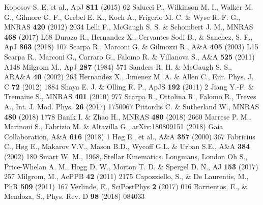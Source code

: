 \documentclass{ws-ijmpd}
\begin{document}
\begin{thebibliography}{0}    %

 Koposov S. E. et al., ApJ {\bf 811} (2015) 62
 Salucci P., Wilkinson M. I., Walker M. G., Gilmore G. F., Grebel E. K.,
  Koch A., Frigerio M. C. \& Wyse R. F. G., MNRAS {\bf 420} (2012) 2034
 Lelli F., McGaugh S. S. \& Schombert J. M., MNRAS {\bf 468} (2017) L68
 Durazo R., Hernandez X., Cervantes Sodi B., \& Sanchez, S. F., ApJ {\bf 863} (2018) 107
 Scarpa R., Marconi G. \& Gilmozzi R., A\&A {\bf 405} (2003) L15
 Scarpa R., Marconi G., Carraro G., Falomo R. \& Villanova S., A\&A {\bf 525}  (2011) A148
 Milgrom M., ApJ {\bf 287} (1984) 571
 Sanders R. H. \& McGaugh S. S., ARA\&A {\bf 40} (2002) 263
 Hernandez X., Jimenez M. A. \& Allen C., Eur. Phys. J. C {\bf 72} (2012) 1884
 Shaya E. J. \& Olling R. P., ApJS {\bf 192} (2011) 2
 Jiang Y.-F. \& Tremaine S., MNRAS {\bf 401} (2010) 977
 Scarpa R., Ottolina R., Falomo R., Treves A., Int. J. Mod. Phys. {\bf 26} (2017) 1750067
 Pittordis C. \& Sutherland W., MNRAS {\bf 480} (2018) 1778
 Banik I. \& Zhao H., MNRAS {\bf 480} (2018) 2660
 Marrese P. M., Marinoni S., Fabrizio M. \& Altavilla G., arXiv:180809151 (2018)
 Gaia Collaboration, A\&A {\bf 616} (2018) 1
 H{\o}g E., et al., A\&A {\bf 357} (2000) 367 
 Fabricius C., H{\o}g E., Makarov V.V., Mason B.D., Wycoff G.L. \& Urban S.E., A\&A {\bf 384} (2002) 180
 Smart W. M., 1968, Stellar Kinematics. Longmans, London
 Oh S., Price-Whelan A. M., Hogg D. W., Morton T. D. \& Spergel D. N., AJ {\bf 153} (2017) 257
 Milgrom, M., AcPPB {\bf42} (2011) 2175
 Capozziello, S., \& De Laurentis, M., PhR {\bf 509} (2011) 167
 Verlinde, E., SciPostPhys {\bf 2}  (2017) 016
 Barrientos, E., \& Mendoza, S., Phys. Rev. D {\bf 98} (2018) 084033


  
\end{thebibliography}
\end{document}
